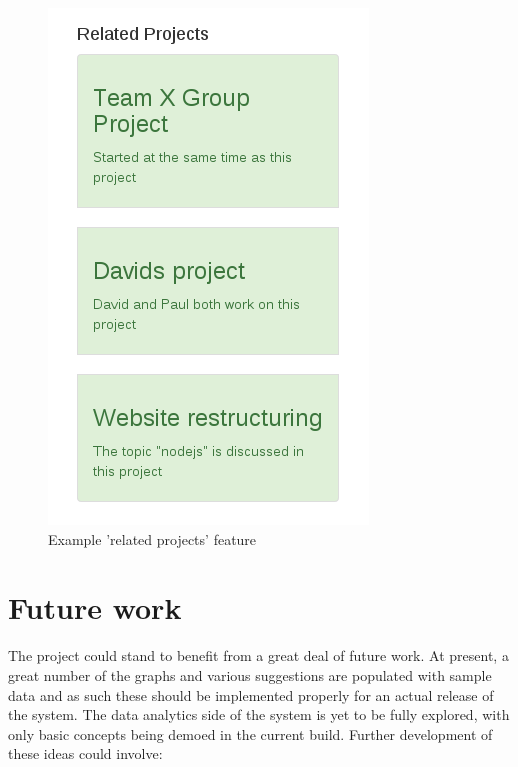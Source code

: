 \documentclass{l4proj}
\begin{document}
\begin{figure}[h]
\includegraphics{RelatedProj.png}
\centering
\caption{Example 'related projects' feature}
\label{fig:5}
\end{figure}


\chapter{Future work}

The project could stand to benefit from a great deal of future work.  At present, a great number of the graphs and various suggestions are populated with sample data and as such these should be implemented properly for an actual release of the system.  The data analytics side of the system is yet to be fully explored, with only basic concepts being demoed in the current build.  Further development of these ideas could involve:
\end{document}
